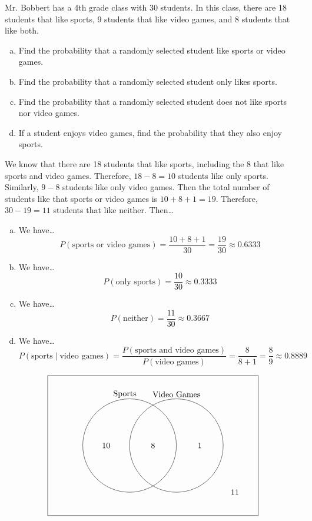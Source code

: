 \documentclass[11pt,letterpaper]{article}
\begin{document}
\newpage



 Mr. Bobbert has a 4th grade class with 30 students. In this class, there are 18 students that like sports, 9 students that like video games, and 8 students that like both.
	\begin{enumerate}[(a)]
	\item Find the probability that a randomly selected student like sports or video games.
	\item Find the probability that a randomly selected student only likes sports. 
	\item Find the probability that a randomly selected student does not like sports nor video games.
	\item If a student enjoys video games, find the probability that they also enjoy sports. 
	\end{enumerate} \pspace

\sol We know that there are 18 students that like sports, including the 8 that like sports and video games. Therefore, $18 - 8= 10$ students like only sports. Similarly, $9 - 8$ students like only video games. Then the total number of students like that sports or video games is $10 + 8 + 1= 19$. Therefore, $30 - 19= 11$ students that like neither. Then\dots

\begin{enumerate}[(a)]
\item We have\dots
	\[
	P(\text{sports or video games})= \dfrac{10 + 8 + 1}{30}= \dfrac{19}{30} \approx 0.6333
	\] \pspace

\item We have\dots
	\[
	P(\text{only sports})= \dfrac{10}{30} \approx 0.3333
	\] \pspace

\item We have\dots
	\[
	P(\text{neither})= \dfrac{11}{30} \approx 0.3667
	\] \pspace

\item We have\dots
	\[
	P(\text{sports} \;|\; \text{video games})= \dfrac{P(\text{sports and video games})}{P(\text{video games})}= \dfrac{8}{8 + 1}= \dfrac{8}{9} \approx 0.8889
	\]
\end{enumerate} \vfill

	\[
	\begin{tikzpicture}
	\draw (0,0) rectangle (9,6);
	\draw (3.5,3) circle (2);
	\draw (5.5,3) circle (2);
	
	\node at (3.3,5.2) {Sports};
	\node at (5.5,5.2) {Video Games}; 
	
	\node at (2.5,3) {10};
	\node at (4.5,3) {8};
	\node at (6.5,3) {1};
	\node at (8,1) {11};
	\end{tikzpicture}
	\]
\end{document}

